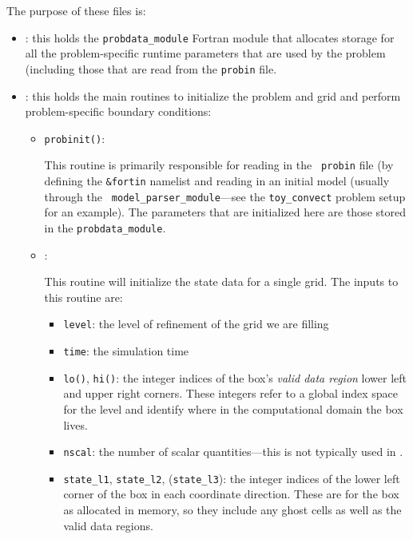 The purpose of these files is:
\begin{itemize}
\item {}: this holds the {\tt probdata\_module} Fortran module
  that allocates storage for all the problem-specific runtime parameters that
  are used by the problem (including those that are read from the {\tt probin}
  file.

\item {}: this holds the main routines to
  initialize the problem and grid and perform problem-specific boundary
  conditions:

  \begin{itemize}
  \item {\tt probinit()}:

    This routine is primarily responsible for reading in the {\tt
      probin} file (by defining the {\tt \&fortin} namelist and
    reading in an initial model (usually through the {\tt
      model\_parser\_module}---see the {\tt toy\_convect} problem
    setup for an example).  The parameters that are initialized
    here are those stored in the {\tt probdata\_module}.

  \item {}:

    This routine will initialize the state data for a single grid.
    The inputs to this routine are:
    \begin{itemize}
    \item {\tt level}: the level of refinement of the grid we are filling

    \item {\tt time}: the simulation time

    \item {\tt lo()}, {\tt hi()}: the integer indices of the box's {\em
      valid data region} lower left and upper right corners.  These
      integers refer to a global index space for the level and
      identify where in the computational domain the box lives.

    \item {\tt nscal}: the number of scalar quantities---this is not typically
      used in \castro.

    \item {\tt state\_l1}, {\tt state\_l2}, ({\tt state\_l3}): the
      integer indices of the lower left corner of the box in each
      coordinate direction.  These are for the box as allocated in memory,
      so they include any ghost cells as well as the valid data regions.


\end{itemize}
\end{itemize}
\end{itemize}
